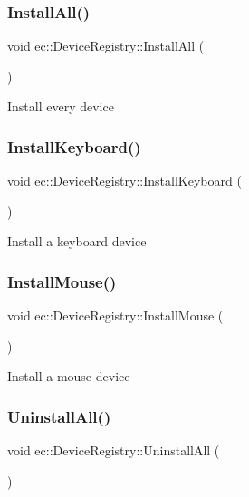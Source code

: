 \subsubsection{\texorpdfstring{Install\+All()}{InstallAll()}}
{\footnotesize\ttfamily void ec\+::\+Device\+Registry\+::\+Install\+All (\begin{DoxyParamCaption}{ }\end{DoxyParamCaption})}

Install every device \mbox{\label{classec_1_1_device_registry_af03e4aa3a084e2519c044b7139000829}} 
\subsubsection{\texorpdfstring{Install\+Keyboard()}{InstallKeyboard()}}
{\footnotesize\ttfamily void ec\+::\+Device\+Registry\+::\+Install\+Keyboard (\begin{DoxyParamCaption}{ }\end{DoxyParamCaption})}

Install a keyboard device \mbox{\label{classec_1_1_device_registry_ab06d3edc52bc1bc296b4b7e2303d70c6}} 
\subsubsection{\texorpdfstring{Install\+Mouse()}{InstallMouse()}}
{\footnotesize\ttfamily void ec\+::\+Device\+Registry\+::\+Install\+Mouse (\begin{DoxyParamCaption}{ }\end{DoxyParamCaption})}

Install a mouse device \mbox{\label{classec_1_1_device_registry_a74ea0255087f1e99c6068663b9d43385}} 
\subsubsection{\texorpdfstring{Uninstall\+All()}{UninstallAll()}}
{\footnotesize\ttfamily void ec\+::\+Device\+Registry\+::\+Uninstall\+All (\begin{DoxyParamCaption}{ }\end{DoxyParamCaption})}

